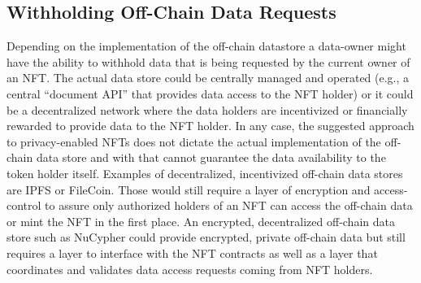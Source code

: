 \documentclass[a4paper, 10pt]{article}
\begin{document}
\subsection{Withholding Off-Chain Data Requests}
Depending on the implementation of the off-chain datastore a data-owner might have the ability to withhold data that is being requested by the current owner of an NFT. The actual data store could be centrally managed and operated (e.g., a central “document API” that provides data access to the NFT holder) or it could be a decentralized network where the data holders are incentivized or financially rewarded to provide data to the NFT holder. In any case, the suggested approach to privacy-enabled NFTs does not dictate the actual implementation of the off-chain data store and with that cannot guarantee the data availability to the token holder itself.
Examples of decentralized, incentivized off-chain data stores are IPFS or FileCoin. Those would still require a layer of encryption and access-control to assure only authorized holders of an NFT can access the off-chain data or mint the NFT in the first place.
An encrypted, decentralized off-chain data store such as NuCypher could provide encrypted, private off-chain data but still requires a layer to interface with the NFT contracts as well as a layer that coordinates and validates data access requests coming from NFT holders.

\printacronyms[include-classes=abbrev,name=Abbreviations]

\printacronyms[include-classes=nomencl,name=Nomenclature]
\end{document}
